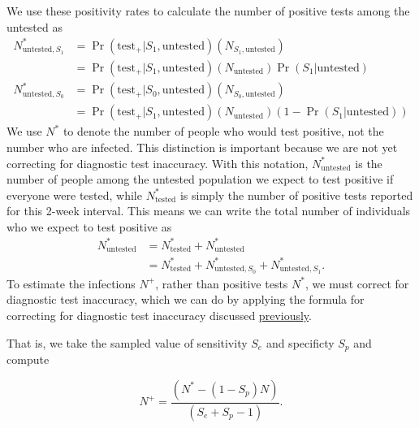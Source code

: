 \documentclass[12pt,twoside]{smiththesis}
\begin{document}
We use these positivity rates to calculate the number of positive tests among the untested as
\begin{align*}
N^*_{\text{untested},S_1} &= \Pr( \text{test}_+ | S_1, \text{untested}) ( N_{S_1,\text{untested}}) \\
&= \Pr( \text{test}_+ | S_1, \text{untested}) (N_{\text{untested}} ) \Pr(S_1|\text{untested})\\
N^*_{\text{untested},S_0} &= \Pr( \text{test}_+ | S_0, \text{untested}) ( N_{S_0,\text{untested}})\\
&= \Pr( \text{test}_+ | S_1, \text{untested}) (N_{\text{untested}} ) (1- \Pr(S_1|\text{untested}))
\end{align*}
We use \(N^*\) to denote the number of people who would test positive, not the number who are infected. This distinction is important because we are not yet correcting for diagnostic test inaccuracy. With this notation, \(N^*_{\text{untested}}\) is the number of people among the untested population we expect to test positive if everyone were tested, while \(N^*_{\text{tested}}\) is simply the number of positive tests reported for this 2-week interval. This means we can write the total number of individuals who we expect to test positive as
\begin{align*}
 N^*_{\text{untested}}
 &= N^*_{\text{tested}} + N^*_{\text{untested}} \\
 &= N^*_{\text{tested}} + N^*_{\text{untested}, S_0} + N^*_{\text{untested}, S_1}.
\end{align*}
To estimate the infections \(N^+\), rather than positive tests \(N^*\), we must correct for diagnostic test inaccuracy, which we can do by applying the formula for correcting for diagnostic test inaccuracy discussed \protect\hyperlink{correct-test-inaccuracy}{previously}.

That is, we take the sampled value of sensitivity \(S_e\) and specificty \(S_p\) and compute

\[N^+ = \dfrac{(N^* - (1 - S_p) N) } { (S_e + S_p - 1) }.\]
\end{document}
